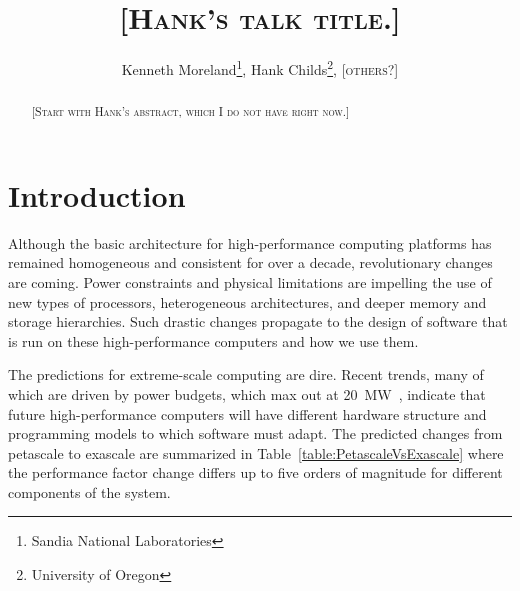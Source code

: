 \documentclass{superfri}
\newcommand*{\lcite}[1]{~\cite{#1}}
\newcommand{\fix}[1]{{\color{red}\textsc{[#1]}}}
\begin{document}
\author{
  Kenneth Moreland\footnote{Sandia National Laboratories},
  Hank Childs\footnote{University of Oregon},
  \fix{others?}
  }

\title{\fix{Hank's talk title.}}

\maketitle{}

\begin{abstract}%
  \fix{Start with Hank's abstract, which I do not have right now.}

\end{abstract}


\section*{Introduction}
\label{sec:Introduction}

\noindent
Although the basic architecture for high-performance computing platforms has
remained homogeneous and consistent for over a decade, revolutionary changes
are coming. Power constraints and physical limitations are impelling the
use of new types of processors, heterogeneous architectures, and deeper
memory and storage hierarchies. Such drastic changes propagate to the
design of software that is run on these high-performance computers and how
we use them.

The predictions for extreme-scale computing are dire.  Recent trends, many
of which are driven by power budgets, which max out at
20~MW\lcite{ExascaleArchitecturesReport}, indicate that future
high-performance computers will have different hardware structure and
programming models to which software must adapt. The predicted changes from
petascale to exascale are summarized in
Table~\ref{table:PetascaleVsExascale} where the performance factor change
differs up to five orders of magnitude for different components of the
system.
\end{document}
